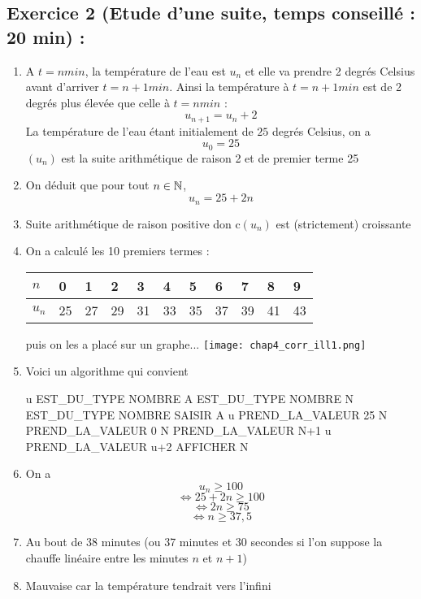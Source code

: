 \subsection*{Exercice 2 (Etude d'une suite, temps conseillé : 20 min) : }
\begin{enumerate}
\item A $t = n min$, la température de l'eau est $u_n$ et elle va prendre 2 degrés Celsius avant d'arriver $t = n+1 min$. Ainsi la température à $t = n+1 min$ est de 2 degrés plus élevée que celle à $t=n min$ : $$\boxed{u_{n+1} = u_n +2}$$ La température de l'eau étant initialement de $25$ degrés Celsius, on a $$\boxed{u_0 = 25}$$ $(u_n)$ est la suite arithmétique de raison 2 et de premier terme 25
\item On déduit que pour tout $n\in \mathbb{N}$, 
$$\boxed{u_n = 25 + 2n}$$
\item Suite arithmétique de raison positive don c$(u_n)$ est (strictement) croissante
\item On a calculé les 10 premiers termes : \newline
\begin{tabularx}{\linewidth}{|X|X|X|X|X|X|X|X|X|X|X|}
\hline
$n$ & 0 & 1 & 2 & 3 & 4 & 5 & 6 & 7 & 8 & 9 \\ \hline
$u_n$ & 25 & 27 & 29 & 31 & 33 & 35 & 37 & 39 & 41 & 43 \\ \hline 
\end{tabularx}\newline 
puis on les a placé sur un graphe...\newline
\texttt{[image: chap4\_corr\_ill1.png]}

\item Voici un algorithme qui convient \newline
\begin{algobox}
\Variables
\Ligne u EST\_DU\_TYPE NOMBRE
\Ligne A EST\_DU\_TYPE NOMBRE
\Ligne N EST\_DU\_TYPE NOMBRE
\DebutAlgo
\Ligne SAISIR A
\Ligne u PREND\_LA\_VALEUR 25
\Ligne N PREND\_LA\_VALEUR 0
\DebutTantQue
\Ligne N PREND\_LA\_VALEUR N+1
\Ligne u PREND\_LA\_VALEUR u+2
\FinTantQue
\Ligne AFFICHER N
\FinAlgo
\end{algobox}
\item On a
$$u_n \geq 100$$
$$\Leftrightarrow 25 + 2n \geq 100$$
$$\Leftrightarrow 2n \geq 75$$
$$\Leftrightarrow n \geq 37,5$$
\item Au bout de 38 minutes (ou 37 minutes et 30 secondes si l'on suppose la chauffe linéaire entre les minutes $n$ et $n+1$)
\item Mauvaise car la température tendrait vers l'infini 
\end{enumerate}
